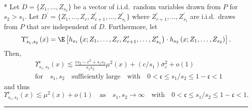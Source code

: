 \newpage
\begin{lem}\label{lem:upsilon_sc}\mbox{}\\*
	Let $D = \{Z_1, \dotsc, Z_{s_2}\}$ be a vector of i.i.d.\ random variables drawn from $P$ for $s_2 > s_1$.
	Let $D^{\prime} = \{Z_1, \dotsc, Z_{c}, Z_{c+1}^{\prime}, \dotsc,  Z_{s_1}^{\prime}\}$ where $Z_{c+1}^{\prime}, \dotsc,  Z_{s_1}^{\prime}$ are i.i.d.\ draws from $P$ that are independent of $D$.
	Furthermore, let
	\begin{equation}
		\Upsilon_{s_1, s_2}^{c}\left(x\right)
		= \E\left[h_{s_1}\left(x; Z_1, \ldots, Z_c, Z^{\prime}_{c+1}, \ldots,  Z^{\prime}_{s_1}\right) \cdot
			h_{s_2}\left(x; Z_1, \ldots, Z_{s_2}\right)\right].
	\end{equation}
	Then,
	\begin{equation}
		\begin{aligned}
			 & \Upsilon_{s_1, s_2}^{c}\left(x\right)
			\lesssim \frac{c s_2 - c^2 + s_1 s_2}{s_1 s_2}\mu^2(x) + (c/s_1) \overline{\sigma}^2_{\varepsilon} + o(1) \\
			 & \text{for} \quad s_1, s_2 \quad \text{sufficiently large}
			\quad \text{with} \quad
			0 < \mathfrak{c} \leq s_1 / s_2 \leq 1 - \mathfrak{c} < 1
		\end{aligned}
	\end{equation}
	and thus
	\begin{equation}
		\Upsilon_{s_1, s_2}^{c}\left(x\right)
		\lesssim \mu^2(x) + o(1)
		\quad \text{as} \quad s_1, s_2 \rightarrow \infty
		\quad \text{with} \quad
		0 < \mathfrak{c} \leq s_1 / s_2 \leq 1 - \mathfrak{c} < 1.
	\end{equation}
\end{lem}
\hrule
